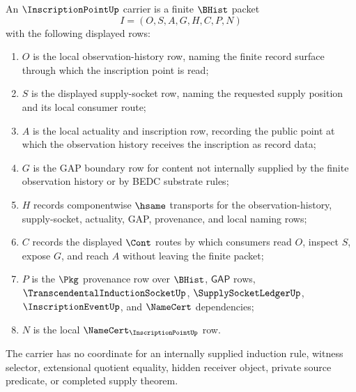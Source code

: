 \begin{definition}
\label{def:inscription-point-namecert-carrier}
An $\InscriptionPointUp$ carrier is a finite $\BHist$ packet
$$
I=(O,S,A,G,H,C,P,N)
$$
with the following displayed rows:
\begin{enumerate}
\item $O$ is the local observation-history row, naming the finite record surface through which the inscription point is read;
\item $S$ is the displayed supply-socket row, naming the requested supply position and its local consumer route;
\item $A$ is the local actuality and inscription row, recording the public point at which the observation history receives the inscription as record data;
\item $G$ is the GAP boundary row for content not internally supplied by the finite observation history or by BEDC substrate rules;
\item $H$ records componentwise $\hsame$ transports for the observation-history, supply-socket, actuality, GAP, provenance, and local naming rows;
\item $C$ records the displayed $\Cont$ routes by which consumers read $O$, inspect $S$, expose $G$, and reach $A$ without leaving the finite packet;
\item $P$ is the $\Pkg$ provenance row over $\BHist$, $\mathsf{GAP}$ rows, $\TranscendentalInductionSocketUp$, $\SupplySocketLedgerUp$, $\InscriptionEventUp$, and $\NameCert$ dependencies;
\item $N$ is the local $\NameCert_{\InscriptionPointUp}$ row.
\end{enumerate}
The carrier has no coordinate for an internally supplied induction rule, witness selector, extensional quotient equality, hidden receiver object, private source predicate, or completed supply theorem.
\end{definition}

